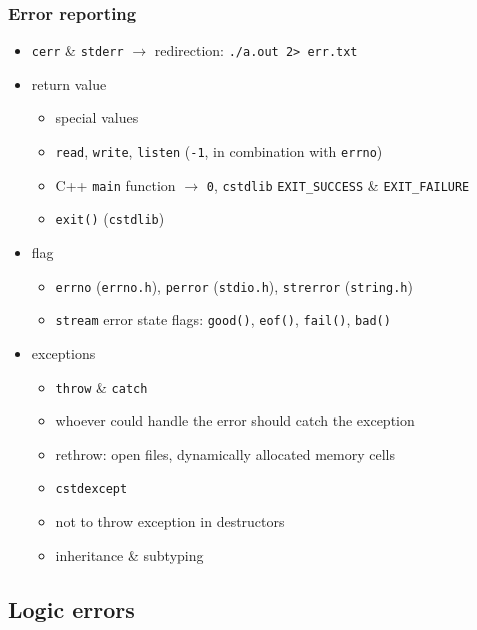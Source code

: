 \begin{frame}
    \frametitle{Error reporting}
    \begin{itemize}[<+->]
        \item \texttt{cerr} \& \texttt{stderr} \onslide<+-> $\longrightarrow$ redirection: \texttt{./a.out 2> err.txt}
        \item return value
        \begin{itemize}[<+->]
            \item special values
            \item \texttt{read}, \texttt{write}, \texttt{listen} (\texttt{-1}, in combination with \texttt{errno})
            \item C++ \texttt{main} function \onslide<+-> $\longrightarrow$ \texttt{0}\onslide<+->, \texttt{cstdlib} \texttt{EXIT\_SUCCESS} \& \texttt{EXIT\_FAILURE}
            \item \texttt{exit()} (\texttt{cstdlib})
        \end{itemize}
        \item flag
        \begin{itemize}[<+->]
            \item \texttt{errno} (\texttt{errno.h})\onslide<+->, \texttt{perror} (\texttt{stdio.h})\onslide<+->, \texttt{strerror} (\texttt{string.h})
            \item \texttt{stream} error state flags\onslide<+->: \texttt{good()}\onslide<+->, \texttt{eof()}\onslide<+->, \texttt{fail()}\onslide<+->, \texttt{bad()}
        \end{itemize}
        \item exceptions
        \begin{itemize}[<+->]
            \item \texttt{throw} \& \texttt{catch}
            \item whoever could handle the error should catch the exception
            \item rethrow\onslide<+->: open files\onslide<+->, dynamically allocated memory cells
            \item \texttt{cstdexcept}
            \item not to throw exception in destructors
            \item inheritance \& subtyping
        \end{itemize}
    \end{itemize}
\end{frame}

\subsection{Logic errors}

